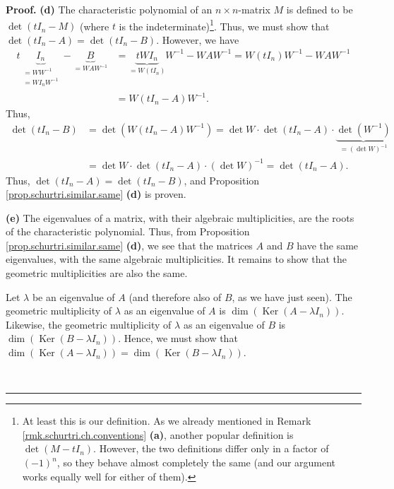 \documentclass[numbers=enddot,12pt,final,onecolumn,notitlepage]{scrartcl}%
\numberwithin{exer}{subsection}
\theoremstyle{definition}
\newenvironment{proof}[1][Proof]{\noindent\textbf{#1.} }{\ \rule{0.5em}{0.5em}}
\begin{document}
\begin{proof}
\textbf{(d)} The characteristic polynomial of an $n\times n$-matrix $M$ is
defined to be $\det\left(  tI_{n}-M\right)  $ (where $t$ is the
indeterminate)\footnote{At least this is our definition. As we already
mentioned in Remark \ref{rmk.schurtri.ch.conventions} \textbf{(a)}, another
popular definition is $\det\left(  M-tI_{n}\right)  $. However, the two
definitions differ only in a factor of $\left(  -1\right)  ^{n}$, so they
behave almost completely the same (and our argument works equally well for
either of them).}. Thus, we must show that $\det\left(  tI_{n}-A\right)
=\det\left(  tI_{n}-B\right)  $. However, we have%
\begin{align*}
t\underbrace{I_{n}}_{\substack{=WW^{-1}\\=WI_{n}W^{-1}}}-\underbrace{B}%
_{=WAW^{-1}}  &  =\underbrace{tWI_{n}}_{=W\left(  tI_{n}\right)  }%
W^{-1}-WAW^{-1}=W\left(  tI_{n}\right)  W^{-1}-WAW^{-1}\\
&  =W\left(  tI_{n}-A\right)  W^{-1}.
\end{align*}
Thus,%
\begin{align*}
\det\left(  tI_{n}-B\right)   &  =\det\left(  W\left(  tI_{n}-A\right)
W^{-1}\right)  =\det W\cdot\det\left(  tI_{n}-A\right)  \cdot\underbrace{\det
\left(  W^{-1}\right)  }_{=\left(  \det W\right)  ^{-1}}\\
&  =\det W\cdot\det\left(  tI_{n}-A\right)  \cdot\left(  \det W\right)
^{-1}=\det\left(  tI_{n}-A\right)  .
\end{align*}
Thus, $\det\left(  tI_{n}-A\right)  =\det\left(  tI_{n}-B\right)  $, and
Proposition \ref{prop.schurtri.similar.same} \textbf{(d)} is proven. \medskip

\textbf{(e)} The eigenvalues of a matrix, with their algebraic multiplicities,
are the roots of the characteristic polynomial. Thus, from Proposition
\ref{prop.schurtri.similar.same} \textbf{(d)}, we see that the matrices $A$
and $B$ have the same eigenvalues, with the same algebraic multiplicities. It
remains to show that the geometric multiplicities are also the same.

Let $\lambda$ be an eigenvalue of $A$ (and therefore also of $B$, as we have
just seen). The geometric multiplicity of $\lambda$ as an eigenvalue of $A$ is
$\dim\left(  \operatorname*{Ker}\left(  A-\lambda I_{n}\right)  \right)  $.
Likewise, the geometric multiplicity of $\lambda$ as an eigenvalue of $B$ is
$\dim\left(  \operatorname*{Ker}\left(  B-\lambda I_{n}\right)  \right)  $.
Hence, we must show that $\dim\left(  \operatorname*{Ker}\left(  A-\lambda
I_{n}\right)  \right)  =\dim\left(  \operatorname*{Ker}\left(  B-\lambda
I_{n}\right)  \right)  $.


\end{proof}
\end{document}
